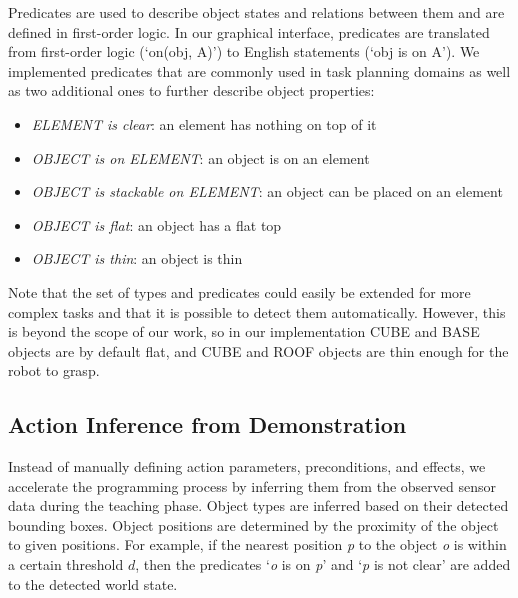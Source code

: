 Predicates are used to describe object states and relations between them and are defined in first-order logic.
In our graphical interface, predicates are translated from first-order logic (`on(obj, A)') to English statements (`obj is on A').
We implemented predicates that are commonly used in task planning domains as well as two additional ones to further describe object properties:
\begin{itemize}
    \item \textit{ELEMENT is clear}: an element has nothing on top of it
    \item \textit{OBJECT is on ELEMENT}: an object is on an element
    \item \textit{OBJECT is stackable on ELEMENT}: an object can be placed on an element
    \item \textit{OBJECT is flat}: an object has a flat top
    \item \textit{OBJECT is thin}: an object is thin
\end{itemize}
Note that the set of types and predicates could easily be extended for more complex tasks and that it is possible to detect them automatically.
However, this is beyond the scope of our work, so in our implementation CUBE and BASE objects are by default flat, and CUBE and ROOF objects are thin enough for the robot to grasp.



\subsection{Action Inference from Demonstration}
\label{sec:inference}
Instead of manually defining action parameters, preconditions, and effects, we accelerate the programming process by inferring them from the observed sensor data during the teaching phase.
Object types are inferred based on their detected bounding boxes.
Object positions are determined by the proximity of the object to given positions.
For example, if the nearest position \emph{p} to the object \emph{o} is within a certain threshold $d$, then the predicates `\emph{o} is on \emph{p}' and `\emph{p} is not clear' are added to the detected world state.


